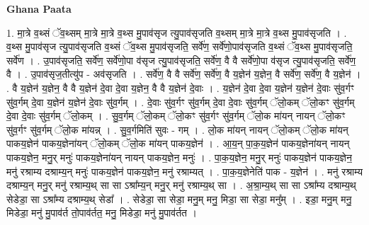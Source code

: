 \documentclass[17pt]{extarticle}
\begin{document}
\textbf{Ghana Paata } \newline

1. मा॒त्रे व॒थ्सं ॅव॒थ्सम् मा॒त्रे मा॒त्रे व॒थ्स मु॒पाव॑सृज त्यु॒पाव॑सृजति व॒थ्सम् मा॒त्रे मा॒त्रे व॒थ्स मु॒पाव॑सृजति । . व॒थ्स मु॒पाव॑सृज त्यु॒पाव॑सृजति व॒थ्सं ॅव॒थ्स मु॒पाव॑सृजति॒ सर्वे॑ण॒ सर्वे॑णो॒पाव॑सृजति व॒थ्सं ॅव॒थ्स मु॒पाव॑सृजति॒ सर्वे॑ण । . उ॒पाव॑सृजति॒ सर्वे॑ण॒ सर्वे॑णो॒पा व॑सृज त्यु॒पाव॑सृजति॒ सर्वे॑ण॒ वै वै सर्वे॑णो॒पा व॑सृज त्यु॒पाव॑सृजति॒ सर्वे॑ण॒ वै । . उ॒पाव॑सृज॒तीत्यु॑प - अव॑सृजति । . सर्वे॑ण॒ वै वै सर्वे॑ण॒ सर्वे॑ण॒ वै य॒ज्ञेन॑ य॒ज्ञेन॒ वै सर्वे॑ण॒ सर्वे॑ण॒ वै य॒ज्ञेन॑ । . वै य॒ज्ञेन॑ य॒ज्ञेन॒ वै वै य॒ज्ञेन॑ दे॒वा दे॒वा य॒ज्ञेन॒ वै वै य॒ज्ञेन॑ दे॒वाः । . य॒ज्ञेन॑ दे॒वा दे॒वा य॒ज्ञेन॑ य॒ज्ञेन॑ दे॒वाः सु॑व॒र्गꣳ सु॑व॒र्गम् दे॒वा य॒ज्ञेन॑ य॒ज्ञेन॑ दे॒वाः सु॑व॒र्गम् । . दे॒वाः सु॑व॒र्गꣳ सु॑व॒र्गम् दे॒वा दे॒वाः सु॑व॒र्गम् ॅलो॒कम् ॅलो॒कꣳ सु॑व॒र्गम् दे॒वा दे॒वाः सु॑व॒र्गम् ॅलो॒कम् । . सु॒व॒र्गम् ॅलो॒कम् ॅलो॒कꣳ सु॑व॒र्गꣳ सु॑व॒र्गम् ॅलो॒क मा॑यन् नायन् ॅलो॒कꣳ सु॑व॒र्गꣳ सु॑व॒र्गम् ॅलो॒क मा॑यन्न् । . सु॒व॒र्गमिति॑ सुवः - गम् । . लो॒क मा॑यन् नायन् ॅलो॒कम् ॅलो॒क मा॑यन् पाकय॒ज्ञेन॑ पाकय॒ज्ञेना॑यन् ॅलो॒कम् ॅलो॒क मा॑यन् पाकय॒ज्ञेन॑ । . आ॒य॒न् पा॒क॒य॒ज्ञेन॑ पाकय॒ज्ञेना॑यन् नायन् पाकय॒ज्ञेन॒ मनु॒र् मनुः॑ पाकय॒ज्ञेना॑यन् नायन् पाकय॒ज्ञेन॒ मनुः॑ । . पा॒क॒य॒ज्ञेन॒ मनु॒र् मनुः॑ पाकय॒ज्ञेन॑ पाकय॒ज्ञेन॒ मनु॑ रश्राम्य दश्राम्य॒न् मनुः॑ पाकय॒ज्ञेन॑ पाकय॒ज्ञेन॒ मनु॑ रश्राम्यत् । . पा॒क॒य॒ज्ञेनेति॑ पाक - य॒ज्ञेन॑ । . मनु॑ रश्राम्य दश्राम्य॒न् मनु॒र् मनु॑ रश्राम्य॒थ् सा सा ऽश्रा᳚म्य॒न् मनु॒र् मनु॑ रश्राम्य॒थ् सा । . अ॒श्रा॒म्य॒थ् सा सा ऽश्रा᳚म्य दश्राम्य॒थ् सेडेडा॒ सा ऽश्रा᳚म्य दश्राम्य॒थ् सेडा᳚ । . सेडेडा॒ सा सेडा॒ मनु॒म् मनु॒ मिडा॒ सा सेडा॒ मनु᳚म् । . इडा॒ मनु॒म् मनु॒ मिडेडा॒ मनु॑ मु॒पाव॑र्त तो॒पाव॑र्तत॒ मनु॒ मिडेडा॒ मनु॑ मु॒पाव॑र्तत । \newline
\end{document}
